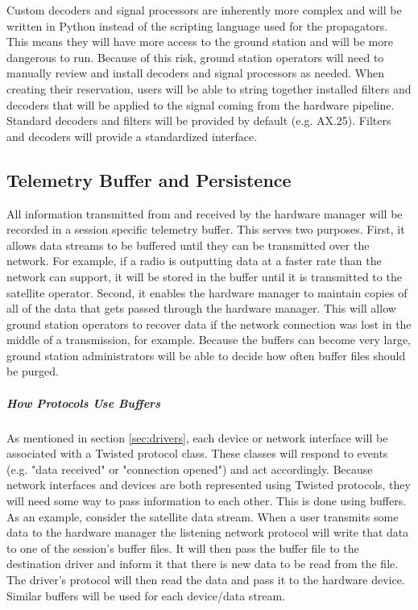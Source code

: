\documentclass{mxl-design}
\begin{document}
Custom decoders and signal processors are inherently more complex and will be written in Python instead of the scripting language used for the propagators. This means they will have more access to the ground station and will be more dangerous to run. Because of this risk, ground station operators will need to manually review and install decoders and signal processors as needed. When creating their reservation, users will be able to string together installed filters and decoders that will be applied to the signal coming from the hardware pipeline. Standard decoders and filters will be provided by default (e.g. AX.25). Filters and decoders will provide a standardized interface.

\subsection{Telemetry Buffer and Persistence}
\label{sec:telemetry_buffer}
All information transmitted from and received by the hardware manager will be recorded in a session specific telemetry buffer. This serves two purposes. First, it allows data streams to be buffered until they can be transmitted over the network. For example, if a radio is outputting data at a faster rate than the network can support, it will be stored in the buffer until it is transmitted to the satellite operator. Second, it enables the hardware manager to maintain copies of all of the data that gets passed through the hardware manager. This will allow ground station operators to recover data if the network connection was lost in the middle of a transmission, for example. Because the buffers can become very large, ground station administrators will be able to decide how often buffer files should be purged.

\subparagraph{How Protocols Use Buffers}
As mentioned in section \ref{sec:drivers}, each device or network interface will be associated with a Twisted protocol class. These classes will respond to events (e.g. "data received" or "connection opened") and act accordingly. Because network interfaces and devices are both represented using Twisted protocols, they will need some way to pass information to each other. This is done using buffers. As an example, consider the satellite data stream. When a user transmits some data to the hardware manager the listening network protocol will write that data to one of the session's buffer files. It will then pass the buffer file to the destination driver and inform it that there is new data to be read from the file. The driver's protocol will then read the data and pass it to the hardware device. Similar buffers will be used for each device/data stream.
\end{document}
